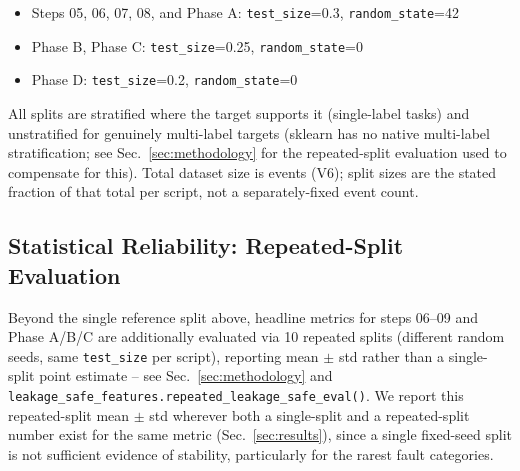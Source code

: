 \begin{itemize}
    \item Steps 05, 06, 07, 08, and Phase A: \texttt{test\_size}=0.3, \texttt{random\_state}=42  %
    \item Phase B, Phase C: \texttt{test\_size}=0.25, \texttt{random\_state}=0  %
    \item Phase D: \texttt{test\_size}=0.2, \texttt{random\_state}=0  %
\end{itemize}

All splits are stratified where the target supports it (single-label tasks) and unstratified for genuinely multi-label targets (sklearn has no native multi-label stratification; see Sec.~\ref{sec:methodology} for the repeated-split evaluation used to compensate for this). Total dataset size is \MetricZeroZeroDataAttritionChainVSixTotalEvents{} events (V6); split sizes are the stated fraction of that total per script, not a separately-fixed event count.

\subsection{Statistical Reliability: Repeated-Split Evaluation}

Beyond the single reference split above, headline metrics for steps 06--09 and Phase A/B/C are additionally evaluated via 10 repeated splits %
(different random seeds, same \texttt{test\_size} per script), reporting mean $\pm$ std rather than a single-split point estimate -- see Sec.~\ref{sec:methodology} and \texttt{leakage\_safe\_features.repeated\_leakage\_safe\_eval()}. We report this repeated-split mean $\pm$ std wherever both a single-split and a repeated-split number exist for the same metric (Sec.~\ref{sec:results}), since a single fixed-seed split is not sufficient evidence of stability, particularly for the rarest fault categories.
